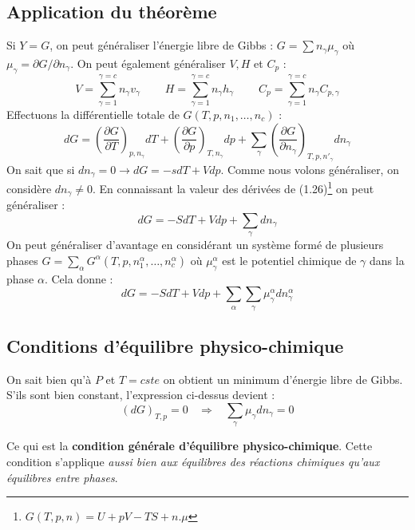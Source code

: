 \documentclass[11pt, a4paper, openany]{book}
\begin{document}
\subsection{Application du théorème}
Si $Y = G$, on peut généraliser l'énergie libre de Gibbs : $G = \sum n_\gamma \mu_\gamma$ où $\mu_\gamma = \partial G / \partial n_\gamma$. On peut également généraliser $V, H$ et $C_p$ :
\begin{equation}
V = \sum_{\gamma = 1}^{\gamma = c} n_\gamma v_\gamma\ \ \ \ \ \ \ \ \ \ 
H = \sum_{\gamma = 1}^{\gamma = c} n_\gamma h_\gamma\ \ \ \ \ \ \ \ \ \ 
C_p = \sum_{\gamma = 1}^{\gamma = c} n_\gamma C_{p,\gamma}
\end{equation}
Effectuons la différentielle totale de $G(T, p, n_1,\dots, n_c)$ :
\begin{equation}
dG = \left( \frac{\partial G}{\partial T} \right)_{p,n_\gamma} dT + \left( \frac{\partial G}{\partial p} \right)_{T,n_\gamma} dp + \sum_\gamma \left( \frac{\partial G}{\partial n_\gamma} \right)_{T, p, n'_\gamma} dn_\gamma
\end{equation}
On sait que si $dn_\gamma = 0 \rightarrow dG = -sdT + Vdp$. Comme nous volons généraliser, on considère $dn_\gamma \neq 0$. En connaissant la valeur des dérivées de (1.26)\footnote{$G(T,p,n) = U + pV - TS + n.\mu$} on peut généraliser :
\begin{equation}
dG = -S dT + V dp + \sum_\gamma dn_\gamma
\end{equation}
On peut généraliser d'avantage en considérant un système formé de plusieurs phases $G = \sum_\alpha G^\alpha(T, p, n_1^\alpha, \dots, n_c^\alpha)$ où $\mu_\gamma^\alpha$ est le potentiel chimique de $\gamma$ dans la phase $\alpha$. Cela donne :
\begin{equation}
dG = -SdT + Vdp + \sum_\alpha \sum_\gamma \mu_\gamma^\alpha dn_\gamma^\alpha
\end{equation}

\subsection{Conditions d'équilibre physico-chimique}
On sait bien qu'à $P$ et $T = cste$ on obtient un minimum d'énergie libre de Gibbs. S'ils sont bien constant, l'expression ci-dessus devient :
\begin{equation}
(dG)_{T, p} = 0 \ \ \ \ \Rightarrow\ \ \ \ \sum_\gamma \mu_\gamma dn_\gamma = 0
\end{equation}

Ce qui est la \textbf{condition générale d'équilibre physico-chimique}. Cette condition s'applique \textit{aussi bien aux équilibres des réactions chimiques qu'aux équilibres entre phases}.\\
\end{document}
